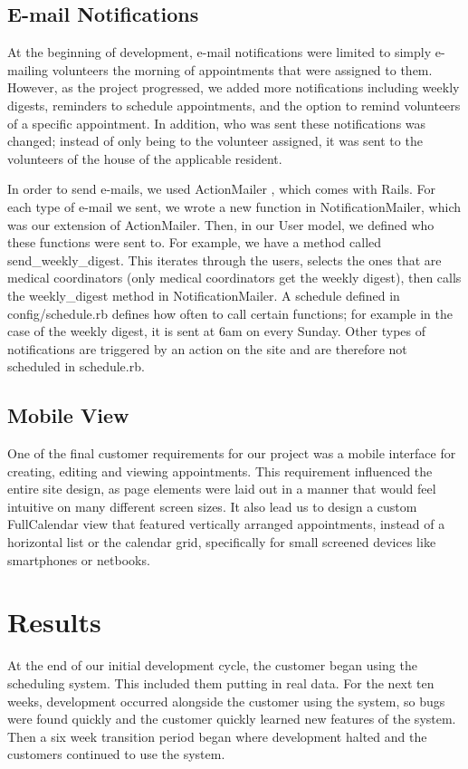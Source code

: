 \documentclass{sig-alternate}
\begin{document}
\subsection{E-mail Notifications}
At the beginning of development, e-mail notifications were limited to simply e-mailing volunteers the morning of appointments that were assigned to them.  However, as the project progressed, we added more notifications including weekly digests, reminders to schedule appointments, and the option to remind volunteers of a specific appointment.  In addition, who was sent these notifications was changed; instead of only being to the volunteer assigned, it was sent to the volunteers of the house of the applicable resident.

In order to send e-mails, we used ActionMailer \cite{actionmailer}, which comes with Rails.  For each type of e-mail we sent, we wrote a new function in NotificationMailer, which was our extension of ActionMailer.  Then, in our User model, we defined who these functions were sent to.  For example, we have a method called send\_weekly\_digest.   This iterates through the users, selects the ones that are medical coordinators (only medical coordinators get the weekly digest), then calls the weekly\_digest method in NotificationMailer.  A schedule defined in config/schedule.rb defines how often to call certain functions; for example in the case of the weekly digest, it is sent at 6am on every Sunday.  Other types of notifications are triggered by an action on the site and are therefore not scheduled in schedule.rb. 

\subsection{Mobile View}
One of the final customer requirements for our project was a mobile interface for creating, editing and viewing appointments. This requirement influenced the entire site design, as page elements were laid out in a manner that would feel intuitive on many different screen sizes. It also lead us to design a custom FullCalendar view that featured vertically arranged appointments, instead of a horizontal list or the calendar grid, specifically for small screened devices like smartphones or netbooks.

\section{Results}
At the end of our initial development cycle, the customer began using the scheduling system.  This included them putting in real data.  For the next ten weeks, development occurred alongside the customer using the system, so bugs were found quickly and the customer quickly learned new features of the system.  Then a six week transition period began where development halted and the customers continued to use the system.
\end{document}
